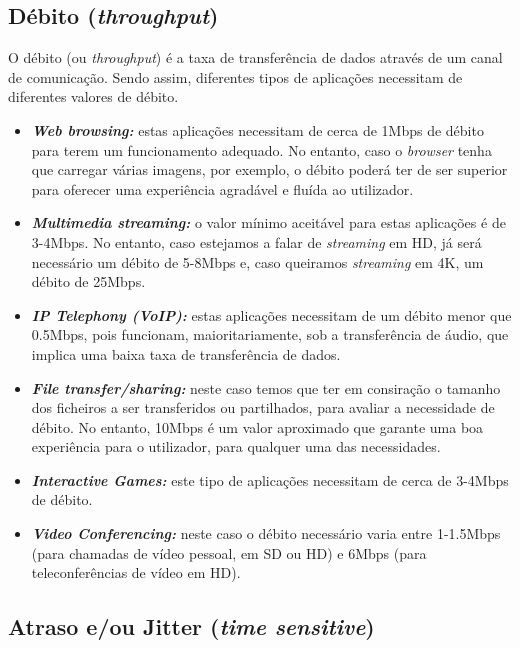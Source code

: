 \documentclass[a4paper, 11pt]{article}
\begin{document}
\subsection{Débito (\textit{throughput}) \cite{broadband_speed_guide}}

O débito (ou \textit{throughput}) é a taxa de transferência de dados através de um canal de comunicação. Sendo assim, diferentes tipos de aplicações necessitam de diferentes valores de débito.

\begin{itemize}
    \item \textit{\textbf{Web browsing:}} estas aplicações necessitam de cerca de 1Mbps de débito para terem um funcionamento adequado. No entanto, caso o \textit{browser} tenha que carregar várias imagens, por exemplo, o débito poderá ter de ser superior para oferecer uma experiência agradável e fluída ao utilizador.
    \item \textit{\textbf{Multimedia streaming:}} o valor mínimo aceitável para estas aplicações é de 3-4Mbps. No entanto, caso estejamos a falar de \textit{streaming} em HD, já será necessário um débito de 5-8Mbps e, caso queiramos \textit{streaming} em 4K, um débito de 25Mbps.
    \item \textit{\textbf{IP Telephony (VoIP):}} estas aplicações necessitam de um débito menor que 0.5Mbps, pois funcionam, maioritariamente, sob a transferência de áudio, que implica uma baixa taxa de transferência de dados.
    \item \textit{\textbf{File transfer/sharing:}} neste caso temos que ter em consiração o tamanho dos ficheiros a ser transferidos ou partilhados, para avaliar a necessidade de débito. No entanto, 10Mbps é um valor aproximado que garante uma boa experiência para o utilizador, para qualquer uma das necessidades.
    \item \textit{\textbf{Interactive Games:}} este tipo de aplicações necessitam de cerca de 3-4Mbps de débito.
    \item \textit{\textbf{Video Conferencing:}} neste caso o débito necessário varia entre 1-1.5Mbps (para chamadas de vídeo pessoal, em SD ou HD) e 6Mbps (para teleconferências de vídeo em HD).
\end{itemize}

\subsection{Atraso e/ou Jitter (\textit{time sensitive}) \cite{network_latency, etsi_tr}}
\end{document}
